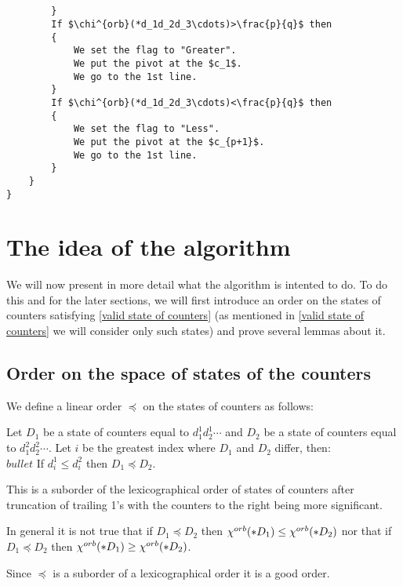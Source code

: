 \begin{lstlisting}[firstnumber=1,consecutivenumbers=true]
            
            
        }
        If $\chi^{orb}(*d_1d_2d_3\cdots)>\frac{p}{q}$ then  
        {
            We set the flag to "Greater".
            We put the pivot at the $c_1$. 
            We go to the 1st line.
        } 
        If $\chi^{orb}(*d_1d_2d_3\cdots)<\frac{p}{q}$ then
        {
            We set the flag to "Less".
            We put the pivot at the $c_{p+1}$.
            We go to the 1st line.
        } 
    }
}
\end{lstlisting}
\section{The idea of the algorithm}\label{the idea of the algorithm}
We will now present in more detail what the algorithm is intented to do. 
To do this and for the later sections, we will first introduce an order on the states 
of counters satisfying \ref{valid state of counters} (as mentioned in 
\ref{valid state of counters} we will consider only such states) and prove several lemmas about it. 
\subsection{Order on the space of states of the counters}
\begin{definition}
We define a linear order $\preceq$ on the states of counters as follows:

Let $D_1$ be a state of counters equal to $d_1^1d_2^1\cdots$ and $D_2$ be a state of counters 
equal to $d_1^2d_2^2\cdots$. Let $i$ be the greatest index where $D_1$ and $D_2$ differ, then:\\
$bullet$ If $d_i^1 \leq d_i^2$ then $D_1 \preceq D_2$. 
\end{definition}

This is a suborder of the lexicographical order 
of states of counters after truncation of trailing 1's 
with the counters to the right being more significant. 

\begin{observation}
In general it is not true that if $D_1 \preceq D_2$ then 
${\chi^{orb}(*D_1)} \leq {\chi^{orb}(*D_2)}$ nor that if $D_1 \preceq D_2$ then 
${\chi^{orb}(*D_1)} \geq {\chi^{orb}(*D_2)}$.
\end{observation}

\begin{observation}\label{good lexicographical order}
Since $\preceq$ is a suborder of a lexicographical order it is a good order. 
\end{observation}

